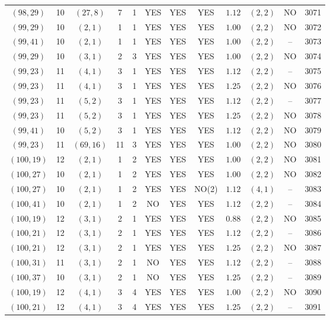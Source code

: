\begin{longtable}{|c|c|c|c|c|c|c|c|c|c|c|c|}
$(98,29)$ & 10 & $(27,8)$ & 7 & 1 & YES & YES & YES & $1.12$ & $(2,2)$ & NO & 3071\\
$(99,29)$ & 10 & $(2,1)$ & 1 & 1 & YES & YES & YES & $1.00$ & $(2,2)$ & NO & 3072\\
$(99,41)$ & 10 & $(2,1)$ & 1 & 1 & YES & YES & YES & $1.00$ & $(2,2)$ & -- & 3073\\
$(99,29)$ & 10 & $(3,1)$ & 2 & 3 & YES & YES & YES & $1.00$ & $(2,2)$ & NO & 3074\\
$(99,23)$ & 11 & $(4,1)$ & 3 & 1 & YES & YES & YES & $1.12$ & $(2,2)$ & -- & 3075\\
$(99,23)$ & 11 & $(4,1)$ & 3 & 1 & YES & YES & YES & $1.25$ & $(2,2)$ & NO & 3076\\
$(99,23)$ & 11 & $(5,2)$ & 3 & 1 & YES & YES & YES & $1.12$ & $(2,2)$ & -- & 3077\\
$(99,23)$ & 11 & $(5,2)$ & 3 & 1 & YES & YES & YES & $1.25$ & $(2,2)$ & NO & 3078\\
$(99,41)$ & 10 & $(5,2)$ & 3 & 1 & YES & YES & YES & $1.12$ & $(2,2)$ & NO & 3079\\
$(99,23)$ & 11 & $(69,16)$ & 11 & 3 & YES & YES & YES & $1.00$ & $(2,2)$ & NO & 3080\\
$(100,19)$ & 12 & $(2,1)$ & 1 & 2 & YES & YES & YES & $1.00$ & $(2,2)$ & NO & 3081\\
$(100,27)$ & 10 & $(2,1)$ & 1 & 2 & YES & YES & YES & $1.00$ & $(2,2)$ & NO & 3082\\
$(100,27)$ & 10 & $(2,1)$ & 1 & 2 & YES & YES & NO(2) & $1.12$ & $(4,1)$ & -- & 3083\\
$(100,41)$ & 10 & $(2,1)$ & 1 & 2 & NO & YES & YES & $1.12$ & $(2,2)$ & -- & 3084\\
$(100,19)$ & 12 & $(3,1)$ & 2 & 1 & YES & YES & YES & $0.88$ & $(2,2)$ & NO & 3085\\
$(100,21)$ & 12 & $(3,1)$ & 2 & 1 & YES & YES & YES & $1.12$ & $(2,2)$ & -- & 3086\\
$(100,21)$ & 12 & $(3,1)$ & 2 & 1 & YES & YES & YES & $1.25$ & $(2,2)$ & NO & 3087\\
$(100,31)$ & 11 & $(3,1)$ & 2 & 1 & NO & YES & YES & $1.12$ & $(2,2)$ & -- & 3088\\
$(100,37)$ & 10 & $(3,1)$ & 2 & 1 & NO & YES & YES & $1.25$ & $(2,2)$ & -- & 3089\\
$(100,19)$ & 12 & $(4,1)$ & 3 & 4 & YES & YES & YES & $1.00$ & $(2,2)$ & NO & 3090\\
$(100,21)$ & 12 & $(4,1)$ & 3 & 4 & YES & YES & YES & $1.25$ & $(2,2)$ & -- & 3091\\

\end{longtable}
